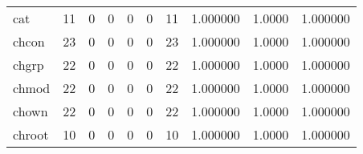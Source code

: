 \begin{longtable}{lrrrrrrrrr}
cat       &                                       11 &                                                  0 &                                                  0 &                                                  0 &                                                  0 &                                                 11 &                                           1.000000 &                                 1.0000 &                             1.000000 \\
chcon     &                                       23 &                                                  0 &                                                  0 &                                                  0 &                                                  0 &                                                 23 &                                           1.000000 &                                 1.0000 &                             1.000000 \\
chgrp     &                                       22 &                                                  0 &                                                  0 &                                                  0 &                                                  0 &                                                 22 &                                           1.000000 &                                 1.0000 &                             1.000000 \\
chmod     &                                       22 &                                                  0 &                                                  0 &                                                  0 &                                                  0 &                                                 22 &                                           1.000000 &                                 1.0000 &                             1.000000 \\
chown     &                                       22 &                                                  0 &                                                  0 &                                                  0 &                                                  0 &                                                 22 &                                           1.000000 &                                 1.0000 &                             1.000000 \\
chroot    &                                       10 &                                                  0 &                                                  0 &                                                  0 &                                                  0 &                                                 10 &                                           1.000000 &                                 1.0000 &                             1.000000 \\

\end{longtable}

